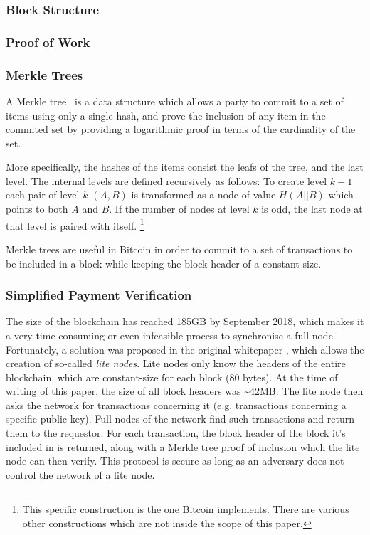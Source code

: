 \documentclass[11pt]{llncs}
\begin{document}
\subsubsection{Block Structure}
\subsubsection{Proof of Work}
\subsubsection{Merkle Trees}
A Merkle tree~\cite{merkle} is a data structure which allows a party to
commit to a set of items using only a single hash, and prove the inclusion of
any item in the commited set by providing a logarithmic proof in terms of the
cardinality of the set.

More specifically, the hashes of the items consist the leafs of the tree, and
the last level. The internal levels are defined recursively as follows: To
create level $k-1$ each pair of level $k$ $(A, B)$ is transformed as a node
of value $H(A || B)$ which points to both $A$ and $B$. If the number of nodes
at level $k$ is odd, the last node at that level is paired with itself.
\footnote{This specific construction is the one Bitcoin implements. There are
various other constructions which are not inside the scope of this paper.}

Merkle trees are useful in Bitcoin in order to commit to a set of
transactions to be included in a block while keeping the block header of a
constant size.

\subsubsection{Simplified Payment Verification}
The size of the blockchain has reached 185GB by September 2018, which makes
it a very time consuming or even infeasible process to synchronise a full
node. Fortunately, a solution was proposed in the original whitepaper
\cite{bitcoin}, which allows the creation of so-called \textit{lite nodes}.
Lite nodes only know the headers of the entire blockchain, which are
constant-size for each block (80 bytes). At the time of writing of this
paper, the size of all block headers was \~{}42MB. The lite node then asks the
network for transactions concerning it (e.g. transactions concerning a
specific public key). Full nodes of the network find such transactions and
return them to the requestor. For each transaction, the block header of the
block it's included in is returned, along with a Merkle tree proof of
inclusion which the lite node can then verify. This protocol is secure as
long as an adversary does not control the network of a lite node.
\end{document}
